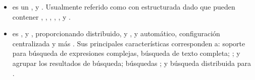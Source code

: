 \begin{itemize}
		\item
			\textbf{\redisNAME} es un \nosqlNAME \openSourcePC, \keyValueDB \cachePC y \store. Usualmente referido como \serverAS con \dataPC estructurada dado que \keysDB pueden contener \stringsPL, \hashesPL, \listsPL, \setsPL, \sortedPL, \bitmapsPL y \hyperloglogsPL \cite{online_redis_website}.

		\item
			\textbf{\solrNAME} es \highly \reliableQA, \scalableQA y \faultTolerantQA, proporcionando \indexingDB distribuido, \replicationDB y \queryingDB \loadBalancedDB, \failoverPC y \recoveryDB automático, configuración centralizada y más \cite{online_official_website_solrn}. Sus principales características corresponden a: soporte para búsqueda de expresiones complejas, búsqueda de texto completa; \stemmingDB; \rankingCPT y agrupar los resultados de búsqueda; búsquedas \geoSpatialCPT; y búsqueda distribuida para \highScalabilityDB \cite{online_dbengines_solr_info}.
		
\end{itemize}

\subsection{\serverSideAS}

